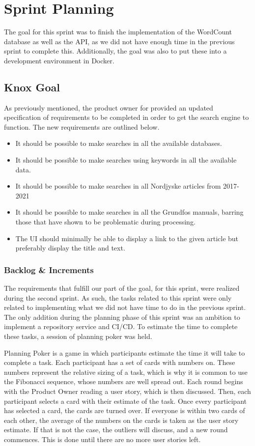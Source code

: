 \section{Sprint Planning}\label{sec:sprintPlanningSprint3}
The goal for this sprint was to finish the implementation of the WordCount database as well as the API, as we did not have enough time in the previous sprint to complete this. Additionally, the goal was also to put these into a development environment in Docker.

\subsection{Knox Goal}\label{ssec:sprint3Goal}
As previously mentioned, the product owner for \knox{} provided an updated specification of requirements to be completed in order to get the search engine to function. The new requirements are outlined below. 
\begin{itemize}
	\item It should be possible to make searches in all the available databases.
	\item It should be possible to make searches using keywords in all the available data.
	\item It should be possible to make searches in all Nordjyske articles from 2017-2021
	\item It should be possible to make searches in all the Grundfos manuals, barring those that have shown to be problematic during processing.
	\item The UI should minimally be able to display a link to the given article but preferably display the title and text.
\end{itemize}


\subsubsection{Backlog \& Increments}
The requirements that fulfill our part of the \knox{} goal, for this sprint, were realized during the second sprint. As such, the tasks related to this sprint were only related to implementing what we did not have time to do in the previous sprint. 
The only addition during the planning phase of this sprint was an ambition to implement a repository service and CI/CD. To estimate the time to complete these tasks, a session of planning poker was held. 

Planning Poker is a game in which participants estimate the time it will take to complete a task. Each participant has a set of cards with numbers on. These numbers represent the relative sizing of a task, which is why it is common to use the Fibonacci sequence, whose numbers are well spread out.
Each round begins with the Product Owner reading a user story, which is then discussed. Then, each participant selects a card with their estimate of the task. Once every participant has selected a card, the cards are turned over. If everyone is within two cards of each other, the average of the numbers on the cards is taken as the user story estimate. If that is not the case, the outliers will discuss, and a new round commences.
This is done until there are no more user stories left\cite{sutherlandScrumArtDoing2014}.


